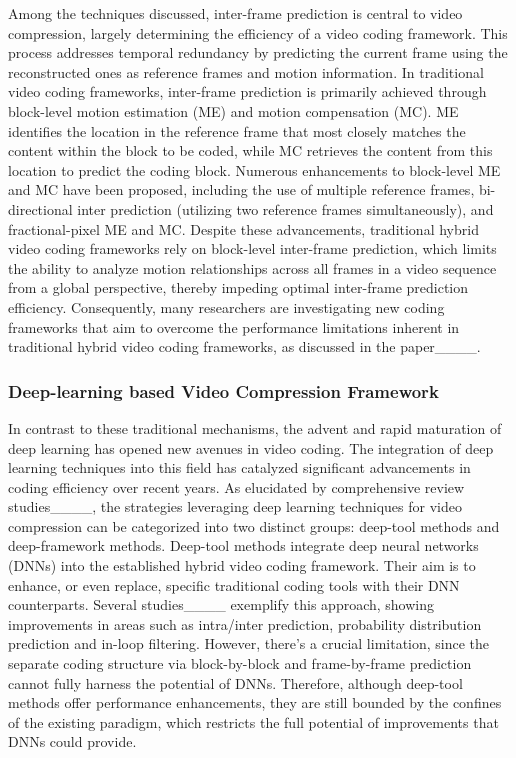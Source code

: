 Among the techniques discussed, inter-frame prediction is central to video compression, largely determining the efficiency of a video coding framework. This process addresses temporal redundancy by predicting the current frame using the reconstructed ones as reference frames and motion information. In traditional video coding frameworks, inter-frame prediction is primarily achieved through block-level motion estimation (ME) and motion compensation (MC). ME identifies the location in the reference frame that most closely matches the content within the block to be coded, while MC retrieves the content from this location to predict the coding block. Numerous enhancements to block-level ME and MC have been proposed, including the use of multiple reference frames, bi-directional inter prediction (utilizing two reference frames simultaneously), and fractional-pixel ME and MC. Despite these advancements, traditional hybrid video coding frameworks rely on block-level inter-frame prediction, which limits the ability to analyze motion relationships across all frames in a video sequence from a global perspective, thereby impeding optimal inter-frame prediction efficiency. Consequently, many researchers are investigating new coding frameworks that aim to overcome the performance limitations inherent in traditional hybrid video coding frameworks, as discussed in the paper____.

\subsubsection{Deep-learning based Video Compression Framework}
In contrast to these traditional mechanisms, the advent and rapid maturation of deep learning has opened new avenues in video coding. The integration of deep learning techniques into this field has catalyzed significant advancements in coding efficiency over recent years. As elucidated by comprehensive review studies____, the strategies leveraging deep learning techniques for video compression can be categorized into two distinct groups: deep-tool methods and deep-framework methods. Deep-tool methods integrate deep neural networks (DNNs) into the established hybrid video coding framework. Their aim is to enhance, or even replace, specific traditional coding tools with their DNN counterparts. Several studies____ exemplify this approach, showing improvements in areas such as intra/inter prediction, probability distribution prediction and in-loop filtering. However, there’s a crucial limitation, since the separate coding structure via block-by-block and frame-by-frame prediction cannot fully harness the potential of DNNs. Therefore, although deep-tool methods offer performance enhancements, they are still bounded by the confines of the existing paradigm, which restricts the full potential of improvements that DNNs could provide.

